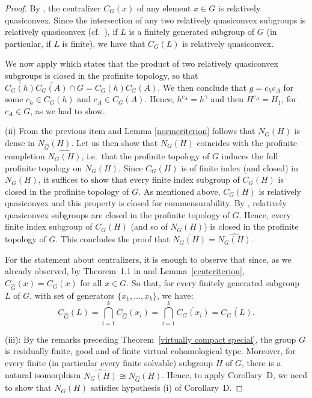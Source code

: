 \documentclass[12pt,twoside]{amsart}
\newcommand\ol{\overline}
\newcommand\wh{\widehat}
\theoremstyle{definition}
\begin{document}
\begin{proof}
By \cite[Theorem 1.1]{MinasyanOsin2012}, the centralizer $C_G(x)$ of any element $x\in G$ is relatively quasiconvex. 
Since the intersection of any two relatively quasiconvex subgroups is relatively quasiconvex (cf.\ \cite[Prop. 4.18]{O}), if $L$ is a finitely generated
subgroup of $G$ (in particular, if $L$ is finite), we have that $C_G(L)$ is relatively quasiconvex. 

We now apply \cite[Theorem 4.8]{GM} which states that the product of two relatively quasiconvex subgroups is closed in the profinite topology, so that
$\overline{C_G(h)}\overline{C_G(A)}\cap G= C_{G}(h)C_{ G}(A)$. We then conclude that $g=c_hc_A$ for some $c_h\in C_G(h)$ and $c_A\in C_G(A)$. 
Hence, $h^{c_A}=h^\gamma$  and then $H^{c_A}=H_1$, for $c_A\in G$,  as we had to show.
\smallskip

\noindent
(ii) From the previous item and Lemma \ref{normcriterion} follows that $N_G(H)$ is dense in $N_{\widehat G}(H)$. Let us then show that $\ol{N_G(H)}$ 
coincides with the profinite completion $\widehat{N_G(H)}$, i.e.\ that the profinite topology of $G$ induces the full profinite topology on $N_G(H)$. 
Since $C_G(H)$ is of finite index (and closed) in $N_G(H)$, it suffices to show that every finite index subgroup of $C_G(H)$ is closed in 
the profinite topology of $G$. As mentioned above, $C_G(H)$ is relatively quasiconvex and this property is closed for commensurability.
By \cite[Theorem 4.7]{GM}, relatively quasiconvex subgroups are closed in the profinite topology of $G$. Hence, every finite index subgroup 
of $C_G(H)$ (and so of $N_G(H)$) is closed in the profinite topology of $G$. This concludes the proof that  $\overline{N_G(H)}=\widehat{N_G(H)}$. 

For the statement about centralizers, it is enough to observe
that since, as we already observed, by Theorem~1.1 in \cite{MZ} and Lemma~\ref{centcriterion}, $C_{\widehat G}(x)=\overline{C_G(x)}$
for all $x\in G$. So that, for every finitely generated subgroup $L$ of $G$, with set of generators $\{x_1,\dots,x_k\}$, we have:
\[C_{\wh{G}}(L)=\bigcap_{i=1}^kC_{\wh{G}}(x_i)=\bigcap_{i=1}^k\ol{C_G(x_i)}=\ol{C_G(L)}.\]
\smallskip

\noindent
(iii): By the remarks preceding Theorem~\ref{virtually compact special}, the group $G$ is residually finite, good and of finite virtual cohomological type.
Moreover, for every  finite (in particular every finite solvable) subgroup $H$ of $G$, there is a 
natural isomorphism $\wh{N_G(H)}\cong N_{\widehat G}(H)$. Hence, to apply Corollary~D, we need to show that $N_G(H)$ satisfies 
hypothesis (i) of Corollary~D.  


\end{proof}
\end{document}
